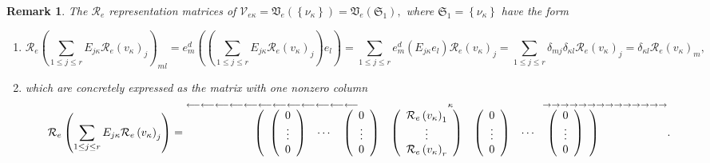 \documentclass[aps,preprint]{revtex4}%
\newtheorem{remark}[theorem]{Remark}
\begin{document}
\begin{remark}
The $\mathcal{R}_{e}$ representation matrices of $\mathcal{V}_{e\kappa
}=\mathfrak{V}_{e}\left(  \left\{  \mathfrak{\nu}_{\kappa}\right\}  \right)
=\mathfrak{V}_{e}\left(  \mathfrak{S}_{1}\right)  ,$ where $\mathfrak{S}%
_{1}=\left\{  \mathfrak{\nu}_{\kappa}\right\}  $ have the form

\begin{enumerate}
\item
\begin{equation}
\mathcal{R}_{e}\left(  \sum_{1\leq j\leq r}E_{j\kappa}\mathcal{R}_{e}\left(
v_{\kappa}\right)  _{j}\right)  _{ml}=e_{m}^{d}\left(  \left(  \sum_{1\leq
j\leq r}E_{j\kappa}\mathcal{R}_{e}\left(  v_{\kappa}\right)  _{j}\right)
e_{l}\right)  =\sum_{1\leq j\leq r}e_{m}^{d}\left(  \overset{}{E_{j\kappa
}e_{l}}\right)  \mathcal{R}_{e}\left(  v_{\kappa}\right)  _{j}=\sum_{1\leq
j\leq r}\delta_{mj}\delta_{\kappa l}\mathcal{R}_{e}\left(  v_{\kappa}\right)
_{j}=\delta_{\kappa l}\mathcal{R}_{e}\left(  v_{\kappa}\right)  _{m},
\end{equation}


\item which are concretely expressed as the matrix with one nonzero column
\begin{equation}
\mathcal{R}_{e}\left(  \sum_{1\leq j\leq r}E_{j\kappa}\mathcal{R}_{e}\left(
v_{\kappa}\right)  _{j}\right)  =\overset{\longleftarrow\longleftarrow
\longleftarrow\longleftarrow\longleftarrow\longleftarrow\longleftarrow
\longleftarrow\longleftarrow\longleftarrow\longleftarrow\longleftarrow
\qquad\qquad\qquad\qquad{\LARGE \kappa}\qquad\qquad\qquad\qquad\rightarrow
\rightarrow\rightarrow\rightarrow\rightarrow\rightarrow\rightarrow
\rightarrow\rightarrow\rightarrow\rightarrow\rightarrow\rightarrow
\rightarrow}{\left(
\begin{array}
[c]{ccccccc}%
\left(
\begin{array}
[c]{c}%
0\\
\vdots\\
0
\end{array}
\right)  & \cdots & \left(
\begin{array}
[c]{c}%
0\\
\vdots\\
0
\end{array}
\right)  & \left(
\begin{array}
[c]{c}%
\mathcal{R}_{e}\left(  v_{\kappa}\right)  _{1}\\
\vdots\\
\mathcal{R}_{e}\left(  v_{\kappa}\right)  _{r}%
\end{array}
\right)  & \left(
\begin{array}
[c]{c}%
0\\
\vdots\\
0
\end{array}
\right)  & \cdots & \left(
\begin{array}
[c]{c}%
0\\
\vdots\\
0
\end{array}
\right)
\end{array}
\right)  }.
\end{equation}


\end{enumerate}
\end{remark}
\end{document}

